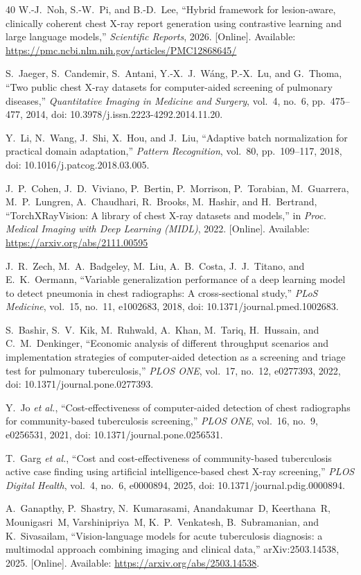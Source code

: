 \documentclass[conference, letterpaper]{IEEEtran}
\begin{document}
\begin{thebibliography}{40}
W.-J.~Noh, S.-W.~Pi, and B.-D.~Lee, ``Hybrid framework for lesion-aware, clinically coherent chest X-ray report generation using contrastive learning and large language models,'' \textit{Scientific Reports}, 2026. [Online]. Available: \url{https://pmc.ncbi.nlm.nih.gov/articles/PMC12868645/}

S.~Jaeger, S.~Candemir, S.~Antani, Y.-X.~J.~W\'ang, P.-X.~Lu, and G.~Thoma, ``Two public chest X-ray datasets for computer-aided screening of pulmonary diseases,'' \textit{Quantitative Imaging in Medicine and Surgery}, vol.~4, no.~6, pp.~475--477, 2014, doi: 10.3978/j.issn.2223-4292.2014.11.20.

Y.~Li, N.~Wang, J.~Shi, X.~Hou, and J.~Liu, ``Adaptive batch normalization for practical domain adaptation,'' \textit{Pattern Recognition}, vol.~80, pp.~109--117, 2018, doi: 10.1016/j.patcog.2018.03.005.

J.~P.~Cohen, J.~D.~Viviano, P.~Bertin, P.~Morrison, P.~Torabian, M.~Guarrera, M.~P.~Lungren, A.~Chaudhari, R.~Brooks, M.~Hashir, and H.~Bertrand, ``TorchXRayVision: A library of chest X-ray datasets and models,'' in \textit{Proc. Medical Imaging with Deep Learning (MIDL)}, 2022. [Online]. Available: \url{https://arxiv.org/abs/2111.00595}

J.~R.~Zech, M.~A.~Badgeley, M.~Liu, A.~B.~Costa, J.~J.~Titano, and E.~K.~Oermann, ``Variable generalization performance of a deep learning model to detect pneumonia in chest radiographs: A cross-sectional study,'' \textit{PLoS Medicine}, vol.~15, no.~11, e1002683, 2018, doi: 10.1371/journal.pmed.1002683.

S.~Bashir, S.~V.~Kik, M.~Ruhwald, A.~Khan, M.~Tariq, H.~Hussain, and C.~M.~Denkinger, ``Economic analysis of different throughput scenarios and implementation strategies of computer-aided detection as a screening and triage test for pulmonary tuberculosis,'' \textit{PLOS ONE}, vol.~17, no.~12, e0277393, 2022, doi: 10.1371/journal.pone.0277393.

Y.~Jo \textit{et al.}, ``Cost-effectiveness of computer-aided detection of chest radiographs for community-based tuberculosis screening,'' \textit{PLOS ONE}, vol.~16, no.~9, e0256531, 2021, doi: 10.1371/journal.pone.0256531.

T.~Garg \textit{et al.}, ``Cost and cost-effectiveness of community-based tuberculosis active case finding using artificial intelligence-based chest X-ray screening,'' \textit{PLOS Digital Health}, vol.~4, no.~6, e0000894, 2025, doi: 10.1371/journal.pdig.0000894.

A.~Ganapthy, P.~Shastry, N.~Kumarasami, Anandakumar~D, Keerthana~R, Mounigasri~M, Varshinipriya~M, K.~P.~Venkatesh, B.~Subramanian, and K.~Sivasailam, ``Vision-language models for acute tuberculosis diagnosis: a multimodal approach combining imaging and clinical data,'' arXiv:2503.14538, 2025. [Online]. Available: \url{https://arxiv.org/abs/2503.14538}.

\end{thebibliography}
\end{document}
